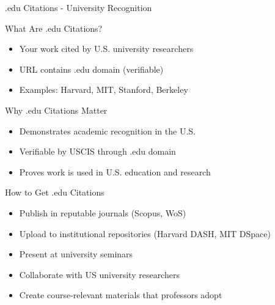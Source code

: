 \documentclass[11pt]{beamer}
\begin{document}
				\begin{frame}{.edu Citations - University Recognition}
					\scriptsize
					\begin{block}{What Are .edu Citations?}
						\begin{itemize}
							\item Your work cited by U.S. university researchers
							\item URL contains .edu domain (verifiable)
							\item Examples: Harvard, MIT, Stanford, Berkeley
						\end{itemize}
					\end{block}
					\begin{block}{Why .edu Citations Matter}
						\begin{itemize}
							\item Demonstrates academic recognition in the U.S.
							\item Verifiable by USCIS through .edu domain
							\item Proves work is used in U.S. education and research
						\end{itemize}
					\end{block}
					\begin{block}{How to Get .edu Citations}
						\begin{itemize}
							\item Publish in reputable journals (Scopus, WoS)
							\item Upload to institutional repositories (Harvard DASH, MIT DSpace)
							\item Present at university seminars
							\item Collaborate with US university researchers
							\item Create course-relevant materials that professors adopt
						\end{itemize}
					\end{block}
				\end{frame}
				
\end{document}
